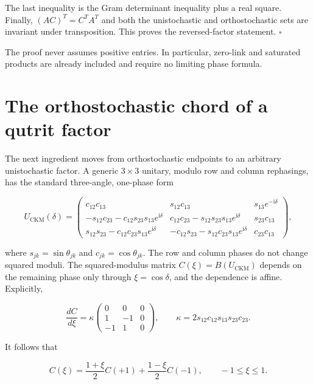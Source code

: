 \documentclass[aip,jmp,amsmath,amssymb,preprint,nofootinbib]{revtex4-2}
\begin{document}
The last inequality is the Gram determinant inequality plus a real square.
Finally, $(AC)^T=C^TA^T$ and both the unistochastic and orthostochastic sets
are invariant under transposition.  This proves the reversed-factor
statement. \hfill$\square$

The proof never assumes positive entries.  In particular, zero-link and
saturated products are already included and require no limiting phase
formula.

\section{The orthostochastic chord of a qutrit factor}
\label{sec:ckm}

The next ingredient moves from orthostochastic endpoints to an arbitrary
unistochastic factor.  A generic $3\times3$ unitary, modulo row and column
rephasings, has the standard three-angle, one-phase form
\cite{ChauKeung1984}

\begin{equation}
 U_{\mathrm{CKM}}(\delta)=
 \begin{pmatrix}
 c_{12}c_{13}&s_{12}c_{13}&s_{13}e^{-\mathrm{i}\delta}\\
 -s_{12}c_{23}-c_{12}s_{23}s_{13}e^{\mathrm{i}\delta}
 &c_{12}c_{23}-s_{12}s_{23}s_{13}e^{\mathrm{i}\delta}
 &s_{23}c_{13}\\
 s_{12}s_{23}-c_{12}c_{23}s_{13}e^{\mathrm{i}\delta}
 &-c_{12}s_{23}-s_{12}c_{23}s_{13}e^{\mathrm{i}\delta}
 &c_{23}c_{13}
 \end{pmatrix},                                   \label{eq:ckm}
\end{equation}

where $s_{jk}=\sin\theta_{jk}$ and $c_{jk}=\cos\theta_{jk}$.  The row and
column phases do not change squared moduli.  The squared-modulus matrix
$C(\xi)=B(U_{\mathrm{CKM}})$ depends on the remaining phase only through
$\xi=\cos\delta$, and the dependence is affine.  Explicitly,

\begin{equation}
 \frac{dC}{d\xi}
 =\kappa\begin{pmatrix}0&0&0\\1&-1&0\\-1&1&0\end{pmatrix},
 \qquad
 \kappa=2s_{12}c_{12}s_{13}s_{23}c_{23}.          \label{eq:chorddirection}
\end{equation}

It follows that

\begin{equation}
 C(\xi)=\frac{1+\xi}{2}C(+1)+\frac{1-\xi}{2}C(-1),
 \qquad -1\leq\xi\leq1.                         \label{eq:chord}
\end{equation}
\end{document}
